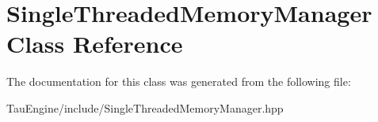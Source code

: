 \hypertarget{class_single_threaded_memory_manager}{}\section{Single\+Threaded\+Memory\+Manager Class Reference}
\label{class_single_threaded_memory_manager}


The documentation for this class was generated from the following file\+:\begin{DoxyCompactItemize}
\item 
Tau\+Engine/include/Single\+Threaded\+Memory\+Manager.\+hpp\end{DoxyCompactItemize}
